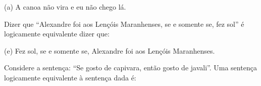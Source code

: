 \documentclass[12pt,letterpaper, onecolumn]{exam}
\begin{document}
\begin{questions}

    \begin{solution}
        (a) A canoa não vira e eu não chego lá.
    \end{solution}
    
    \question[q11] Dizer que “Alexandre foi aos Lençóis Maranhenses, se e somente se, fez sol” é logicamente equivalente dizer que: 
    

    \begin{solution}
        (e) Fez sol, se e somente se, Alexandre foi aos Lençóis Maranhenses.
    \end{solution}

    \pagebreak

    \question[q12] Considere a sentença: “Se gosto de capivara, então gosto de javali”. Uma sentença logicamente equivalente à sentença dada é: 
    

\end{questions}
\end{document}
